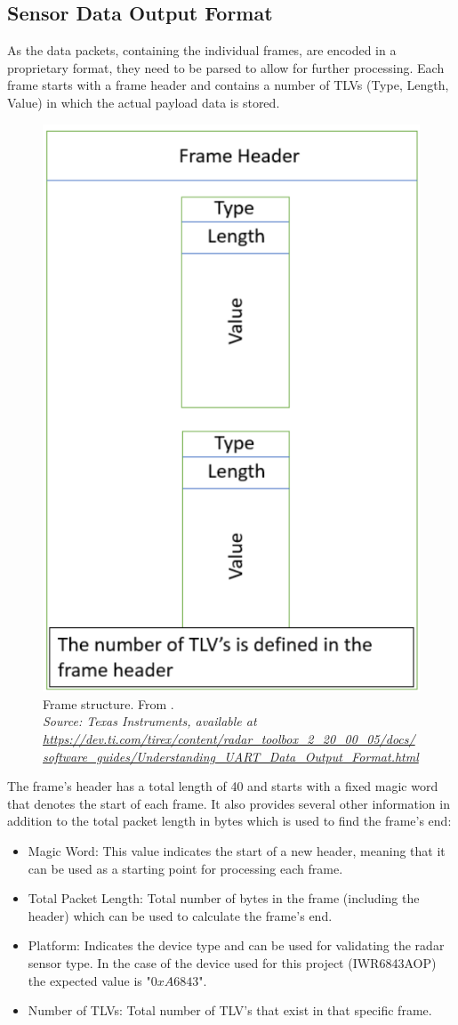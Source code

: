 \subsection{Sensor Data Output Format}
As the data packets, containing the individual frames, are encoded in a proprietary format, they need to be parsed to allow for further processing.
Each frame starts with a frame header and contains a number of TLVs (Type, Length, Value) in which the actual payload data is stored\cite{mmwave_demo_doc}.
\begin{figure}[!htbp]
    \centering
    \includegraphics[width=0.4\linewidth]{images/UARTFrame.png}
    \caption{Frame structure. From \cite{mmwave_demo_output}.\\
    \textit{Source: Texas Instruments, available at \url{https://dev.ti.com/tirex/content/radar_toolbox_2_20_00_05/docs/software_guides/Understanding_UART_Data_Output_Format.html}}}
    \label{fig:UART data output format}
\end{figure}
\FloatBarrier\noindent
The frame's header has a total length of \SI{40}{\byte} and starts with a fixed magic word that denotes the start of each frame.
It also provides several other information in addition to the total packet length in bytes which is used to find the frame's end:
\begin{itemize}
    \item Magic Word: This value indicates the start of a new header, meaning that it can be used as a starting point for processing each frame.
    \item Total Packet Length: Total number of bytes in the frame (including the header) which can be used to calculate the frame's end.
    \item Platform: Indicates the device type and can be used for validating the radar sensor type. In the case of the device used for this project (IWR6843AOP) the expected value is "$0xA6843$".
    \item Number of TLVs: Total number of TLV's that exist in that specific frame.
\end{itemize}
